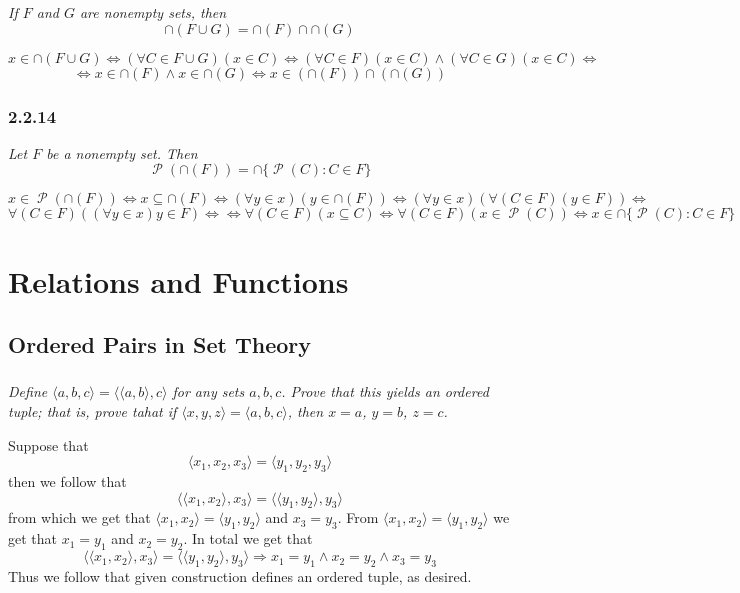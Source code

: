 \documentclass[11pt,oneside,titlepage]{book}
\DeclareMathOperator \pow {\mathcal {P}}
\DeclareMathOperator \lra {\Leftrightarrow}
\DeclareMathOperator \imp {\Rightarrow}
\newcommand{\eangle}[1]{\langle #1 \rangle}
\begin{document}
\textit{If $F$ and $G$ are nonempty sets, then }
$$\cap(F \cup G) = \cap(F) \cap  \cap(G)$$

$$x \in \cap(F \cup G) \lra (\forall C \in F \cup G)(x \in C) \lra (\forall C \in F)(x \in C) \land
(\forall C \in G)(x \in C) \lra $$
$$ \lra x \in \cap(F) \land x \in \cap(G) \lra x \in (\cap(F)) \cap (\cap(G))$$


\subsection*{2.2.14}

\textit{Let $F$ be a nonempty set. Then}
$$\pow(\cap (F)) = \cap\{\pow(C): C \in F\}$$

$$x \in \pow(\cap (F)) \lra x \subseteq \cap (F) \lra (\forall y \in x)(y \in \cap (F)) \lra
(\forall y \in x)(\forall (C \in F) (y \in F)) \lra $$
$$
\forall (C \in F) ( (\forall y \in x) y \in F) \lra
\lra \forall(C \in F)(x \subseteq C) \lra \forall(C \in F)(x \in \pow(C)) \lra x \in  \cap\{\pow(C): C \in F\}$$

\chapter{Relations and Functions}

\section{Ordered Pairs in Set Theory}

\subsection{}

\textit{Define $\eangle{a, b, c} = \eangle{\eangle{a, b}, c}$ for any sets $a, b, c$. Prove that this yields an
  ordered tuple; that is, prove tahat if $\eangle{x, y, z} = \eangle{a, b, c}$, then $x = a$, $y = b$, $z = c$.}

Suppose that
$$\eangle{x_1, x_2, x_3} = \eangle{y_1, y_2, y_3}$$
then we follow that
$$\eangle{\eangle{x_1, x_2}, x_3} = \eangle{\eangle{y_1, y_2}, y_3}$$
from which we get that $\eangle{x_1, x_2} = \eangle{y_1, y_2}$ and $x_3 = y_3$. From
$\eangle{x_1, x_2} = \eangle{y_1, y_2}$ we get that $x_1  = y_1$ and $x_2 = y_2$. In
total we get that
$$\eangle{\eangle{x_1, x_2}, x_3} = \eangle{\eangle{y_1, y_2}, y_3}
\imp x_1 = y_1 \land x_2 = y_2 \land x_3 = y_3$$
Thus we follow that given construction defines an ordered tuple, as desired.
\end{document}
